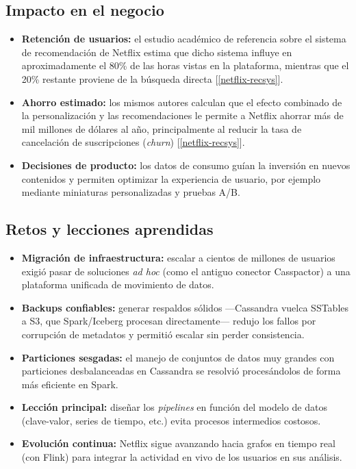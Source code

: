 \documentclass[12pt,a4paper]{article}
\begin{document}
\subsection{Impacto en el negocio}
\begin{itemize}
    \item \textbf{Retención de usuarios:} el estudio académico de referencia sobre el sistema de recomendación de Netflix estima que dicho sistema influye en aproximadamente el 80\% de las horas vistas en la plataforma, mientras que el 20\% restante proviene de la búsqueda directa [\ref{netflix-recsys}].
    \item \textbf{Ahorro estimado:} los mismos autores calculan que el efecto combinado de la personalización y las recomendaciones le permite a Netflix ahorrar más de mil millones de dólares al año, principalmente al reducir la tasa de cancelación de suscripciones (\textit{churn}) [\ref{netflix-recsys}].
    \item \textbf{Decisiones de producto:} los datos de consumo guían la inversión en nuevos contenidos y permiten optimizar la experiencia de usuario, por ejemplo mediante miniaturas personalizadas y pruebas A/B.
\end{itemize}

\subsection{Retos y lecciones aprendidas}
\begin{itemize}
    \item \textbf{Migración de infraestructura:} escalar a cientos de millones de usuarios exigió pasar de soluciones \textit{ad hoc} (como el antiguo conector Casspactor) a una plataforma unificada de movimiento de datos.
    \item \textbf{Backups confiables:} generar respaldos sólidos —Cassandra vuelca SSTables a S3, que Spark/Iceberg procesan directamente— redujo los fallos por corrupción de metadatos y permitió escalar sin perder consistencia.
    \item \textbf{Particiones sesgadas:} el manejo de conjuntos de datos muy grandes con particiones desbalanceadas en Cassandra se resolvió procesándolos de forma más eficiente en Spark.
    \item \textbf{Lección principal:} diseñar los \textit{pipelines} en función del modelo de datos (clave-valor, series de tiempo, etc.) evita procesos intermedios costosos.
    \item \textbf{Evolución continua:} Netflix sigue avanzando hacia grafos en tiempo real (con Flink) para integrar la actividad en vivo de los usuarios en sus análisis.
\end{itemize}
\newpage
\end{document}
